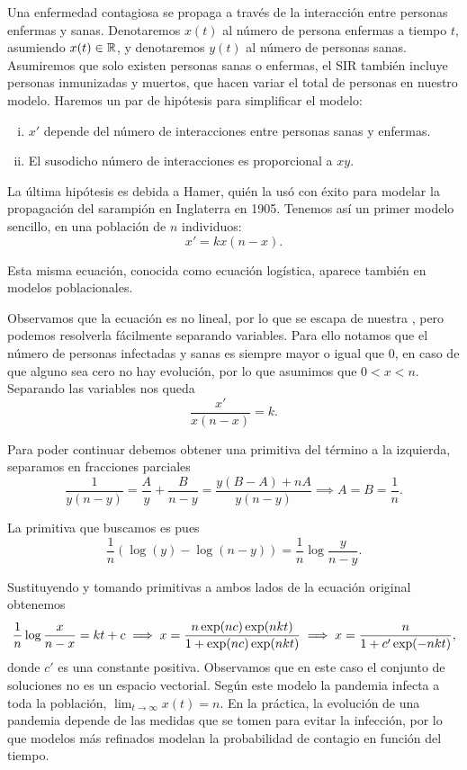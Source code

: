\documentclass[../ecuaciones_diferenciales.tex]{subfiles}
\begin{document}
Una enfermedad contagiosa se propaga a través de la interacción entre personas
enfermas y sanas. Denotaremos \(x(t)\) al número de persona enfermas a tiempo
\(t\), asumiendo \(x(t) \in \mathbb{R}\), y denotaremos \(y(t)\) al número de personas
sanas. Asumiremos que solo existen personas sanas o enfermas, el SIR también
incluye personas inmunizadas y muertos, que hacen variar el total de personas en
nuestro modelo. Haremos un par de hipótesis para simplificar el modelo:
\begin{enumerate}[(i)]
	\item \(x'\) depende del número de interacciones entre personas sanas y
	      enfermas.

	\item El susodicho número de interacciones es proporcional a \(xy\).
\end{enumerate}

La última hipótesis es debida a Hamer, quién la usó con éxito para modelar
la propagación del sarampión en Inglaterra en 1905. Tenemos así un primer
modelo sencillo, en una población de \(n\) individuos:
\[x' = k x(n - x).\]

\begin{remark}
	Esta misma ecuación, conocida como ecuación logística, aparece también en
	modelos poblacionales.
\end{remark}

Observamos que la ecuación es no lineal, por lo que se escapa de nuestra
, pero podemos resolverla fácilmente separando
variables. Para ello notamos que el número de personas infectadas y sanas es
siempre mayor o igual que 0, en caso de que alguno sea cero no hay evolución,
por lo que asumimos que \(0 < x < n\).  Separando las variables nos queda
\[\frac{x'}{x(n - x)} = k.\]

Para poder continuar debemos obtener una primitiva del término a la izquierda,
separamos en fracciones parciales
\[\frac{1}{y(n - y)} = \frac{A}{y} + \frac{B}{n - y}
	= \frac{y(B - A) + nA}{y(n - y)} \implies A = B = \frac{1}{n}.\]

La primitiva que buscamos es pues
\[\frac{1}{n} (\log(y) - \log(n - y)) = \frac{1}{n} \log \frac{y}{n - y}.\]

Sustituyendo y tomando primitivas a ambos lados de la ecuación original obtenemos
\[\frac{1}{n} \log\frac{x}{n - x} = kt + c
	\implies x = \frac{n \expf{nc} \expf{nkt}}{1 + \expf{nc} \expf{nkt}}
	\implies x = \frac{n}{1 + c' \expf{-nkt}},\]
donde \(c'\) es una constante positiva. Observamos que en este caso el
conjunto de soluciones no es un espacio vectorial. Según este modelo la
pandemia infecta a toda la población, \(\lim_{t \to \infty} x(t) = n\). En la
práctica, la evolución de una pandemia depende de las medidas que se tomen
para evitar la infección, por lo que modelos más refinados modelan la
probabilidad de contagio en función del tiempo.
\end{document}
